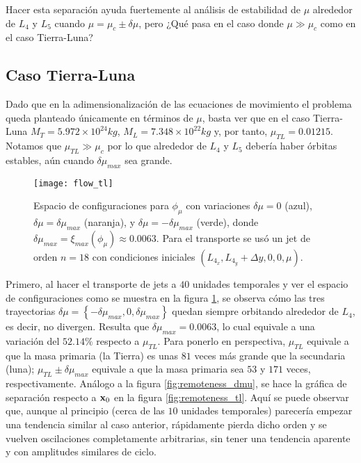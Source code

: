 Hacer esta separación ayuda fuertemente al análisis de estabilidad de $\mu$ alrededor de $L_4$ y $L_5$ cuando $\mu = \mu_c \pm \delta\mu$, pero ¿Qué pasa en el caso donde $\mu \gg \mu_c$ como en el caso Tierra-Luna?

\subsection{Caso Tierra-Luna}
Dado que en la adimensionalización de las ecuaciones de movimiento el problema queda planteado únicamente en términos de $\mu$, basta ver que en el caso Tierra-Luna $M_T = 5.972 \times 10^{24} kg $, $M_L = 7.348 \times 10^{22} kg$ y, por tanto, $\mu_{TL} = 0.01215$. Notamos que $\mu_{TL} \gg \mu_c$ por lo que alrededor de $L_4$ y $L_5$ debería haber órbitas estables, aún cuando $\delta\mu_{max}$ sea grande.

\begin{figure}
 \centering
 \texttt{[image: flow\_tl]}
 \caption{Espacio de configuraciones para $\phi_\mu$ con variaciones $\delta\mu = 0$ (azul), $\delta\mu = \delta\mu_{max}$ (naranja), y $\delta\mu = -\delta\mu_{max}$ (verde), donde $\delta\mu_{max} = \xi_{max}(\phi_\mu) \approx 0.0063$. Para el transporte se usó un jet de orden $n=18$ con condiciones iniciales $\left( L_{4_x}, L_{4_y} + \Delta y, 0, 0, \mu \right)$.}
 \label{fig:flow_tl}
\end{figure}

Primero, al hacer el transporte de jets a $40$ unidades temporales y ver el espacio de configuraciones como se muestra en la figura \ref{fig:flow_tl}, se observa cómo las tres trayectorias $\delta\mu = \left\lbrace -\delta\mu_{max}, 0, \delta\mu_{max} \right\rbrace$ quedan siempre orbitando alrededor de $L_4$, es decir, no divergen. Resulta que $\delta\mu_{max} = 0.0063 $, lo cual equivale a una variación del $52.14 \%$ respecto a $\mu_{TL}$. Para ponerlo en perspectiva, $\mu_{TL}$ equivale a que la masa primaria (la Tierra) es unas $81$ veces más grande que la secundaria (luna); $\mu_{TL} \pm \delta\mu_{max}$ equivale a que la masa primaria sea $53$ y $171$ veces, respectivamente. Análogo a la figura \ref{fig:remoteness_dmu}, se hace la gráfica de separación respecto a $\mathbf{x}_0$ en la figura \ref{fig:remoteness_tl}. Aquí se puede observar que, aunque al principio (cerca de las $10$ unidades temporales) parecería empezar una tendencia similar al caso anterior, rápidamente pierda dicho orden y se vuelven oscilaciones completamente arbitrarias, sin tener una tendencia aparente y con amplitudes similares de ciclo.

